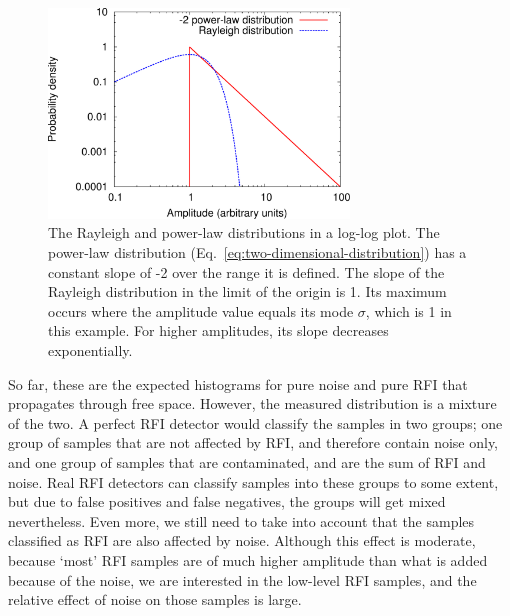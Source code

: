 \documentclass[useAMS,usenatbib]{mn2e}
\begin{document}
\begin{figure}
\begin{center}\hspace{-5mm}\includegraphics[width=8cm]{img/plot-rayleigh-and-rfi-trimmed}
\caption{The Rayleigh and power-law distributions in a log-log plot. The power-law distribution (Eq.~\eqref{eq:two-dimensional-distribution}) has a constant slope of -2 over the range it is defined. The slope of the Rayleigh distribution in the limit of the origin is 1. Its maximum occurs where the amplitude value equals its mode $\sigma$, which is 1 in this example. For higher amplitudes, its slope decreases exponentially.}
\label{fig:rayleigh-and-rfi-distributions}
\end{center}
\end{figure}

So far, these are the expected histograms for pure noise and pure RFI that propagates through free space. However, the measured distribution is a mixture of the two. A perfect RFI detector would classify the samples in two groups; one group of samples that are not affected by RFI, and therefore contain noise only, and one group of samples that are contaminated, and are the sum of RFI and noise. Real RFI detectors can classify samples into these groups to some extent, but due to false positives and false negatives, the groups will get mixed nevertheless. Even more, we still need to take into account that the samples classified as RFI are also affected by noise. Although this effect is moderate, because `most' RFI samples are of much higher amplitude than what is added because of the noise, we are interested in the low-level RFI samples, and the relative effect of noise on those samples is large.
\end{document}
